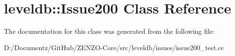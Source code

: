 \hypertarget{classleveldb_1_1_issue200}{}\section{leveldb\+::Issue200 Class Reference}
\label{classleveldb_1_1_issue200}


The documentation for this class was generated from the following file\+:\begin{DoxyCompactItemize}
\item 
D\+:/\+Documentz/\+Git\+Hub/\+Z\+E\+N\+Z\+O-\/\+Core/src/leveldb/issues/issue200\+\_\+test.\+cc\end{DoxyCompactItemize}
